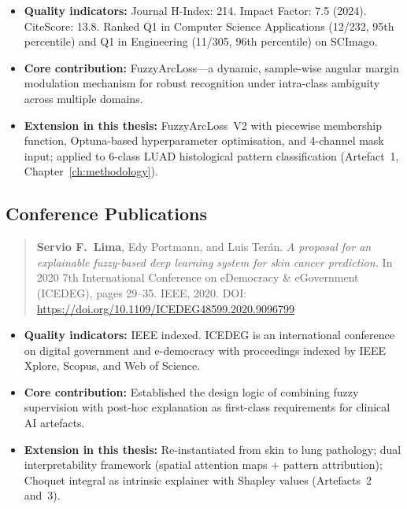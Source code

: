 \begin{itemize}
    \item \textbf{Quality indicators:} Journal H-Index: 214.
    Impact Factor: 7.5 (2024). CiteScore: 13.8.
    Ranked Q1 in Computer Science Applications (12/232, 95th percentile)
    and Q1 in Engineering (11/305, 96th percentile) on SCImago.
    \item \textbf{Core contribution:} FuzzyArcLoss---a dynamic,
    sample-wise angular margin modulation mechanism for robust
    recognition under intra-class ambiguity across multiple domains.
    \item \textbf{Extension in this thesis:} FuzzyArcLoss~V2 with
    piecewise membership function, Optuna-based hyperparameter
    optimisation, and 4-channel mask input; applied to 6-class LUAD
    histological pattern classification (Artefact~1,
    Chapter~\ref{ch:methodology}).
\end{itemize}

\subsection*{Conference Publications}

\begin{quote}
\textbf{Servio F.\ Lima}, Edy Portmann, and Luis Ter\'{a}n.
\emph{A proposal for an explainable fuzzy-based deep learning system
for skin cancer prediction.}
In 2020 7th International Conference on eDemocracy \& eGovernment
(ICEDEG), pages 29--35. IEEE, 2020.
DOI: \url{https://doi.org/10.1109/ICEDEG48599.2020.9096799}
\end{quote}

\begin{itemize}
    \item \textbf{Quality indicators:} IEEE indexed.
    ICEDEG is an international conference on digital government and
    e-democracy with proceedings indexed by IEEE Xplore, Scopus,
    and Web of Science.
    \item \textbf{Core contribution:} Established the design logic of
    combining fuzzy supervision with post-hoc explanation as
    first-class requirements for clinical AI artefacts.
    \item \textbf{Extension in this thesis:} Re-instantiated from skin
    to lung pathology; dual interpretability framework (spatial
    attention maps + pattern attribution); Choquet integral as intrinsic
    explainer with Shapley values (Artefacts~2 and~3).
\end{itemize}

